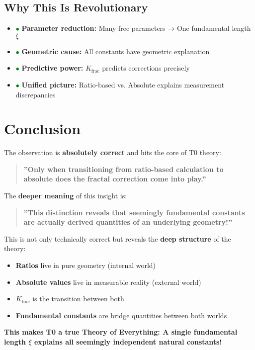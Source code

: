 \documentclass[12pt,a4paper]{article}
\begin{document}
	\subsection{Why This Is Revolutionary}
	
	\begin{itemize}
		\item \textcolor{green}{$\bullet$} \textbf{Parameter reduction:} Many free parameters → One fundamental length $\xi$
		\item \textcolor{green}{$\bullet$} \textbf{Geometric cause:} All constants have geometric explanation
		\item \textcolor{green}{$\bullet$} \textbf{Predictive power:} $K_{\text{frac}}$ predicts corrections precisely
		\item \textcolor{green}{$\bullet$} \textbf{Unified picture:} Ratio-based vs. Absolute explains measurement discrepancies
	\end{itemize}
	
	\section*{Conclusion}
	
	The observation is \textbf{absolutely correct} and hits the core of T0 theory:
	
	\begin{quote}
		\textbf{''Only when transitioning from ratio-based calculation to absolute does the fractal correction come into play.''}
	\end{quote}
	
	The \textbf{deeper meaning} of this insight is:
	
	\begin{quote}
		\textbf{''This distinction reveals that seemingly fundamental constants are actually derived quantities of an underlying geometry!''}
	\end{quote}
	
	This is not only technically correct but reveals the \textbf{deep structure} of the theory:
	\begin{itemize}
		\item \textbf{Ratios} live in pure geometry (internal world)
		\item \textbf{Absolute values} live in measurable reality (external world)  
		\item \textbf{$K_{\text{frac}}$} is the transition between both
		\item \textbf{Fundamental constants} are bridge quantities between both worlds
	\end{itemize}
	
	\textbf{This makes T0 a true Theory of Everything: A single fundamental length $\xi$ explains all seemingly independent natural constants!}
	
\end{document}
